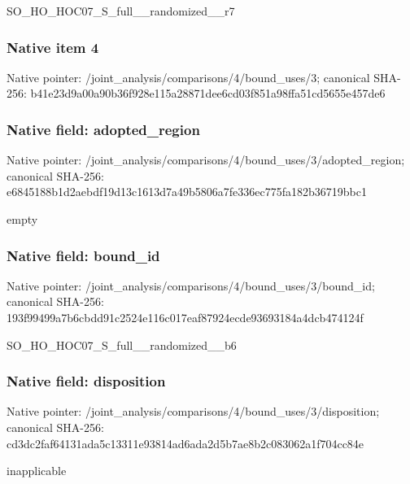 \documentclass[10pt,a4paper]{article}
\begin{document}
\begingroup\raggedright\sloppy SO\_\allowbreak{}HO\_\allowbreak{}HOC07\_\allowbreak{}S\_\allowbreak{}full\_\allowbreak{}\_\allowbreak{}randomized\_\allowbreak{}\_\allowbreak{}r7\par\endgroup

\subsubsection{Native item 4}
Native pointer: /joint\_\allowbreak{}analysis/comparisons/4/bound\_\allowbreak{}uses/3; canonical SHA-256: b41e23d9a00a90b36f928e115a28871dee6cd03f851a98ffa51cd5655e457de6

\subsubsection{Native field: adopted\_\allowbreak{}region}
Native pointer: /joint\_\allowbreak{}analysis/comparisons/4/bound\_\allowbreak{}uses/3/adopted\_\allowbreak{}region; canonical SHA-256: e6845188b1d2aebdf19d13c1613d7a49b5806a7fe336ec775fa182b36719bbc1

\begingroup\raggedright\sloppy empty\par\endgroup

\subsubsection{Native field: bound\_\allowbreak{}id}
Native pointer: /joint\_\allowbreak{}analysis/comparisons/4/bound\_\allowbreak{}uses/3/bound\_\allowbreak{}id; canonical SHA-256: 193f99499a7b6cbdd91c2524e116c017eaf87924ecde93693184a4dcb474124f

\begingroup\raggedright\sloppy SO\_\allowbreak{}HO\_\allowbreak{}HOC07\_\allowbreak{}S\_\allowbreak{}full\_\allowbreak{}\_\allowbreak{}randomized\_\allowbreak{}\_\allowbreak{}b6\par\endgroup

\subsubsection{Native field: disposition}
Native pointer: /joint\_\allowbreak{}analysis/comparisons/4/bound\_\allowbreak{}uses/3/disposition; canonical SHA-256: cd3dc2faf64131ada5c13311e93814ad6ada2d5b7ae8b2c083062a1f704cc84e

\begingroup\raggedright\sloppy inapplicable\par\endgroup
\end{document}
